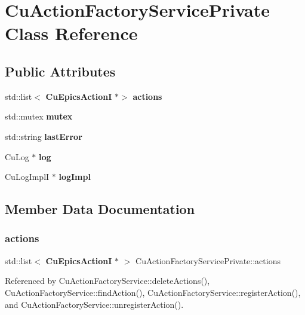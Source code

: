 \section{Cu\+Action\+Factory\+Service\+Private Class Reference}
\label{classCuActionFactoryServicePrivate}
\subsection*{Public Attributes}
\begin{DoxyCompactItemize}
\item 
std\+::list$<$ \textbf{ Cu\+Epics\+ActionI} $\ast$$>$ \textbf{ actions}
\item 
std\+::mutex \textbf{ mutex}
\item 
std\+::string \textbf{ last\+Error}
\item 
Cu\+Log $\ast$ \textbf{ log}
\item 
Cu\+Log\+ImplI $\ast$ \textbf{ log\+Impl}
\end{DoxyCompactItemize}


\subsection{Member Data Documentation}
\mbox{\label{classCuActionFactoryServicePrivate_a502adf0b8a4a3bc68922f5977eb2d179}} 
\subsubsection{actions}
{\footnotesize\ttfamily std\+::list$<$\textbf{ Cu\+Epics\+ActionI} $\ast$ $>$ Cu\+Action\+Factory\+Service\+Private\+::actions}



Referenced by Cu\+Action\+Factory\+Service\+::delete\+Actions(), Cu\+Action\+Factory\+Service\+::find\+Action(), Cu\+Action\+Factory\+Service\+::register\+Action(), and Cu\+Action\+Factory\+Service\+::unregister\+Action().

\mbox{\label{classCuActionFactoryServicePrivate_a36106c47d6eee3f8bfcccfe8c8e22480}} 
